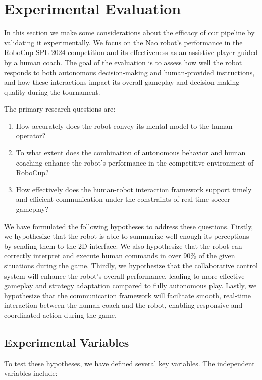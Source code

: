 \documentclass[a4paper, onecolumn, 12pt]{article}
\begin{document}
\section{Experimental Evaluation} 

In this section we make some considerations about the efficacy of our pipeline by validating it experimentally. We focus on the Nao robot's performance in the RoboCup SPL 2024 competition and its effectiveness as an assistive player guided by a human coach. The goal of the evaluation is to assess how well the robot responds to both autonomous decision-making and human-provided instructions, and how these interactions impact its overall gameplay and decision-making quality during the tournament.

The primary research questions are:

\begin{enumerate}
    \item How accurately does the robot convey its mental model to the human operator?
    \item To what extent does the combination of autonomous behavior and human coaching enhance the robot’s performance in the competitive environment of RoboCup?
    \item How effectively does the human-robot interaction framework support timely and efficient communication under the constraints of real-time soccer gameplay?
\end{enumerate}

We have formulated the following hypotheses to address these questions. Firstly, we hypothesize that the robot is able to summarize well enough its perceptions by sending them to the 2D interface. We also hypothesize that the robot can correctly interpret and execute human commands in over 90\% of the given situations during the game. Thirdly, we hypothesize that the collaborative control system will enhance the robot's overall performance, leading to more effective gameplay and strategy adaptation compared to fully autonomous play. Lastly, we hypothesize that the communication framework will facilitate smooth, real-time interaction between the human coach and the robot, enabling responsive and coordinated action during the game.

\subsection{Experimental Variables}

To test these hypotheses, we have defined several key variables. The independent variables include:
\end{document}
